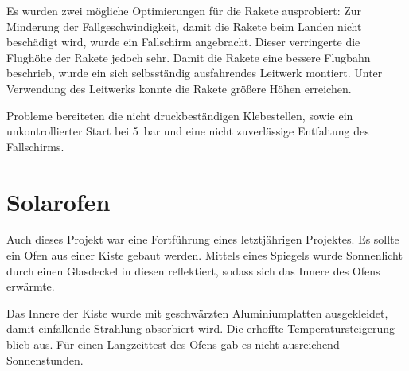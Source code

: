 \documentclass[
  captions=tableheading,  %
  titlepage=false, %
  twocolumn,
  headings=small,
]{scrartcl}
\begin{document}
Es wurden zwei mögliche Optimierungen für die Rakete ausprobiert:
Zur Minderung der Fallgeschwindigkeit, damit die Rakete beim Landen nicht beschädigt wird, wurde ein Fallschirm angebracht.
Dieser verringerte die Flughöhe der Rakete jedoch sehr.
Damit die Rakete eine bessere Flugbahn beschrieb, wurde ein sich selbsständig ausfahrendes Leitwerk montiert.
Unter Verwendung des Leitwerks konnte die Rakete größere Höhen erreichen.

Probleme bereiteten die nicht druckbeständigen Klebestellen, sowie ein unkontrollierter Start bei \SI{5}{\bar} und eine nicht zuverlässige Entfaltung des Fallschirms.

\section*{Solarofen}
Auch dieses Projekt war eine Fortführung eines letztjährigen Projektes.
Es sollte ein Ofen aus einer Kiste gebaut werden.
Mittels eines Spiegels wurde Sonnenlicht durch einen Glasdeckel in diesen reflektiert, sodass sich das Innere des Ofens erwärmte.

Das Innere der Kiste wurde mit geschwärzten Aluminiumplatten ausgekleidet, damit einfallende Strahlung absorbiert wird.
Die erhoffte Temperatursteigerung blieb aus.
Für einen Langzeittest des Ofens gab es nicht ausreichend Sonnenstunden.
\end{document}
